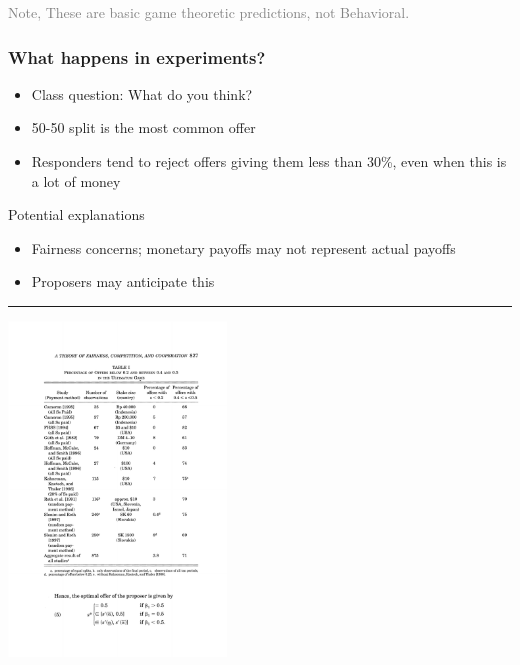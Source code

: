 \documentclass[]{article}
\providecommand{\tightlist}{%
  \setlength{\itemsep}{0pt}\setlength{\parskip}{0pt}}
\begin{document}
\textcolor{gray}{Note, These are basic game theoretic predictions, not Behavioral.}

\hypertarget{what-happens-in-experiments}{%
\subsubsection{What happens in
experiments?}\label{what-happens-in-experiments}}

\begin{itemize}
\tightlist
\item
  Class question: What do you think?
\end{itemize}

\bigskip

\begin{itemize}
\tightlist
\item
  50-50 split is the most common offer
\item
  Responders tend to reject offers giving them less than 30\%, even when
  this is a lot of money
\end{itemize}

\bigskip

Potential explanations

\begin{itemize}
\tightlist
\item
  Fairness concerns; monetary payoffs may not represent actual payoffs
\item
  Proposers may anticipate this
\end{itemize}

\begin{center}\rule{0.5\linewidth}{\linethickness}\end{center}

\includegraphics[height=3.5in]{picsfigs/ult_table.pdf}
\end{document}
